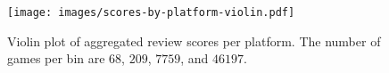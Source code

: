 

\begin{figure}[!t]
	\centering
	\texttt{[image: images/scores-by-platform-violin.pdf]}
	\caption{Violin plot of aggregated review scores per platform. The number of games per bin are $68$, $209$, $7759$, and $46197$.}
\label{fig:scores-by-platform}
\end{figure}

